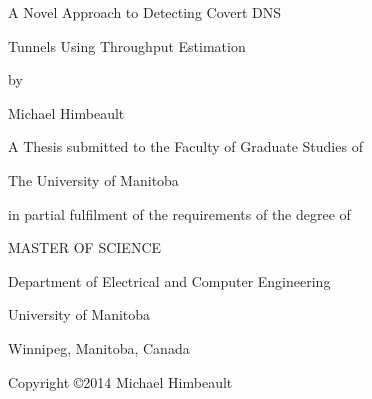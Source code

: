 \documentclass[12pt]{report}
\theoremstyle{remark}
\theoremstyle{definition}
\theoremstyle{definition}
\theoremstyle{definition}
\begin{document}

%

\pagestyle{empty}

\begin{titlepage}
\centerline{\huge{A Novel Approach to Detecting Covert DNS}}
\vspace{10mm}
\centerline{\huge{Tunnels Using Throughput Estimation}}
\vspace{20mm}
\centerline{by}
\vspace{5mm}
\centerline{\large{Michael Himbeault}}
\vspace{20mm}
\centerline{\large{A Thesis submitted to the Faculty of Graduate Studies of}}
\vspace{5mm}
\centerline{\large{The University of Manitoba}}
\vspace{5mm}
\centerline{\large{in partial fulfilment of the requirements of the degree of}}
\vspace{13mm}
\centerline{\LARGE{MASTER OF SCIENCE}}
\vspace{15mm}
\centerline{\large{Department of Electrical and Computer Engineering}}
\vspace{2mm}
\centerline{\large{University of Manitoba}}
\vspace{2mm}
\centerline{\large{Winnipeg, Manitoba, Canada}}
\vfill
\centerline{\large{Copyright \copyright 2014 Michael Himbeault}}
\end{titlepage}
\end{document}
